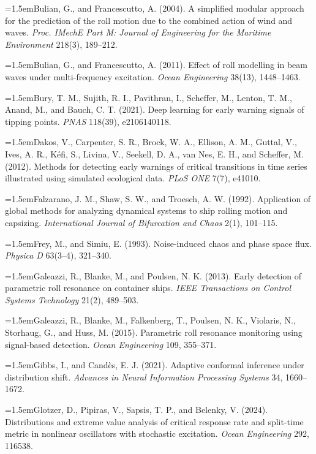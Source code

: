 \documentclass[11pt]{article}
\begin{document}
\hangindent=1.5em\noindent Bulian, G., and Francescutto, A. (2004). A simplified modular approach for the prediction of the roll motion due to the combined action of wind and waves. \emph{Proc. IMechE Part M: Journal of Engineering for the Maritime Environment} 218(3), 189--212.\par
\hangindent=1.5em\noindent Bulian, G., and Francescutto, A. (2011). Effect of roll modelling in beam waves under multi-frequency excitation. \emph{Ocean Engineering} 38(13), 1448--1463.\par
\hangindent=1.5em\noindent Bury, T. M., Sujith, R. I., Pavithran, I., Scheffer, M., Lenton, T. M., Anand, M., and Bauch, C. T. (2021). Deep learning for early warning signals of tipping points. \emph{PNAS} 118(39), e2106140118.\par
\hangindent=1.5em\noindent Dakos, V., Carpenter, S. R., Brock, W. A., Ellison, A. M., Guttal, V., Ives, A. R., K\'efi, S., Livina, V., Seekell, D. A., van Nes, E. H., and Scheffer, M. (2012). Methods for detecting early warnings of critical transitions in time series illustrated using simulated ecological data. \emph{PLoS ONE} 7(7), e41010.\par
\hangindent=1.5em\noindent Falzarano, J. M., Shaw, S. W., and Troesch, A. W. (1992). Application of global methods for analyzing dynamical systems to ship rolling motion and capsizing. \emph{International Journal of Bifurcation and Chaos} 2(1), 101--115.\par
\hangindent=1.5em\noindent Frey, M., and Simiu, E. (1993). Noise-induced chaos and phase space flux. \emph{Physica D} 63(3--4), 321--340.\par
\hangindent=1.5em\noindent Galeazzi, R., Blanke, M., and Poulsen, N. K. (2013). Early detection of parametric roll resonance on container ships. \emph{IEEE Transactions on Control Systems Technology} 21(2), 489--503.\par
\hangindent=1.5em\noindent Galeazzi, R., Blanke, M., Falkenberg, T., Poulsen, N. K., Violaris, N., Storhaug, G., and Huss, M. (2015). Parametric roll resonance monitoring using signal-based detection. \emph{Ocean Engineering} 109, 355--371.\par
\hangindent=1.5em\noindent Gibbs, I., and Cand\`es, E. J. (2021). Adaptive conformal inference under distribution shift. \emph{Advances in Neural Information Processing Systems} 34, 1660--1672.\par
\hangindent=1.5em\noindent Glotzer, D., Pipiras, V., Sapsis, T. P., and Belenky, V. (2024). Distributions and extreme value analysis of critical response rate and split-time metric in nonlinear oscillators with stochastic excitation. \emph{Ocean Engineering} 292, 116538.\par
\end{document}
